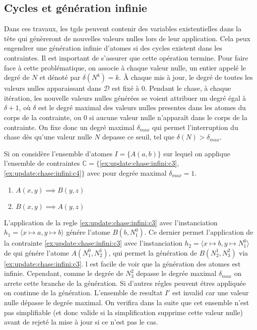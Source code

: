\subsection{Cycles et génération infinie}
Dans ces travaux, les \glspl{tgd} peuvent contenir des variables existentielles dans la tête qui génèreront de nouvelles valeurs nulles lors de leur application.
Cela peux engendrer une génération infinie d'atomes si des cycles existent dans les contraintes.
Il est important de s'assurer que cette opération termine.
Pour faire face à cette problématique, on associe à chaque valeur nulle, un entier appelé le degré de $N$ et dénoté par $\delta(N^k) = k$.
À chaque mis à jour, le degré de toutes les valeurs nulles apparaissant dans $\mathcal{D}$ est fixé à $0$.
Pendant le \gls{chase}, à chaque itération, les nouvelle valeurs nulles générées se voient attribuer un degré égal à $\delta + 1$, où $\delta$ est le degré maximal des valeurs nulles presentes dans les atomes du corps de la contrainte, ou $0$ si aucune valeur nulle n'apparaît dans le corps de la contrainte.
On fixe donc un degré maximal $\delta_{max}$ qui permet l'interruption du \gls{chase} dès qu'une valeur nulle $N$ depasse ce seuil, tel que $\delta(N) > \delta_{max}$.

\begin{example}
    \label{ex:update:chase:infini}
    Si on considère l'ensemble d'atomes $I = \{A(a, b)\}$ sur lequel on applique l'ensemble de contraintes $\mathbb{C} = \{$\ref{ex:update:chase:infini:c3}, \ref{ex:update:chase:infini:c4}$\}$ avec pour degrée maximal $\delta_{max} = 1$.
    \begin{enumerate}[label=\textbf{$c_\arabic*$ :},ref=$c_\arabic*$]
        \item $A(x, y) \implies B(y, z)$ \label{ex:update:chase:infini:c3}
        \item $B(x, y) \implies A(y, z)$ \label{ex:update:chase:infini:c4}
    \end{enumerate}

    L'application de la regle \ref{ex:update:chase:infini:c3} avec l'instanciation $h_1 = \langle x \mapsto a, y \mapsto b \rangle$ génére l'atome $B(b, N_1^0)$.
    Ce dernier permet l'application de la contrainte \ref{ex:update:chase:infini:c3} avec l'instanciation $h_2 = \langle x \mapsto b, y \mapsto N_1^0 \rangle$ de qui génére l'atome $A(N_1^0, N_2^1)$, qui permet la génération de $B(N_2^1, N_3^2)$ via \ref{ex:update:chase:infini:c3}.
    l est facile de voir que la génération des atomes est infinie.
    Cependant, comme le degrée de $N_3^2$ depasse le degrée maximal $\delta_{max}$ on arrete cette branche de la génération.
    Si d'autres régles peuvent étres appliquée on continue de la génération.
    L'ensemble de resultat $I'$ est invalid car une valeur nulle dépasse le degrée maximal.
    On verifira dans la suite que cet ensemble n'est pas simplifiable (et donc valide si la simplification supprime cette valeur nulle) avant de rejeté la mise à jour si ce n'est pas le cas.
\end{example}

